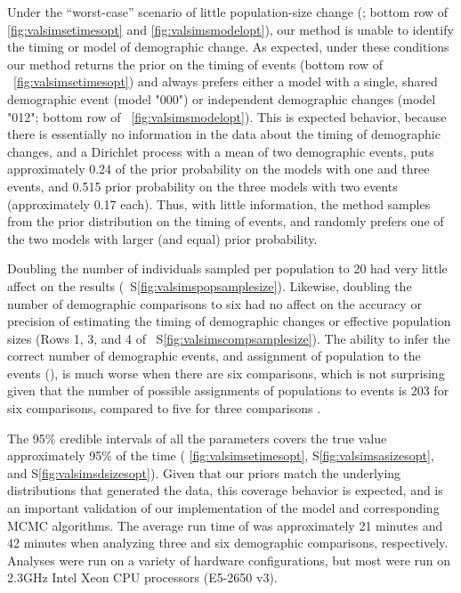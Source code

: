 \ifembed{

}{}

Under the ``worst-case'' scenario of little population-size change
(\vsimnochange; bottom row of \figs \ref{fig:valsimsetimesopt} and
\ref{fig:valsimsmodelopt}),
our method is unable to identify the timing or model of demographic change.
As expected, under these conditions our method returns the prior on the timing
of events (bottom row of \fig{}~\ref{fig:valsimsetimesopt})
and always prefers either a model with a single, shared demographic
event (model "000") or independent demographic changes (model "012";
bottom row of \fig{}~\ref{fig:valsimsmodelopt}).
This is expected behavior, because there is essentially no information in the
data about the timing of demographic changes, and a Dirichlet process with a
mean of two demographic events, puts approximately 0.24 of the prior
probability on the models with one and three events, and 0.515 prior
probability on the three models with two events (approximately 0.17 each).
Thus, with little information, the method samples from the prior distribution
on the timing of events, and randomly prefers one of the two models with larger
(and equal) prior probability.

Doubling the number of individuals sampled per population to 20 had very little
affect on the results
(\fig{}~S\ref{fig:valsimspopsamplesize}).
Likewise, doubling the number of demographic comparisons to six had no affect
on the accuracy or precision of estimating the timing of demographic changes
or effective population sizes
(Rows 1, 3, and 4 of \fig{}~S\ref{fig:valsimscompsamplesize}).
The ability to infer the correct number of demographic events,
and assignment of population to the events (\etimesets),
is much worse when there are six comparisons, which is
not surprising given that the number of possible assignments
of populations to events is 203 for six comparisons, compared
to five for three comparisons \citep{Bell1934}.

The 95\% credible intervals of all the parameters
covers the true value approximately 95\% of the time
(\figs
\ref{fig:valsimsetimesopt},
S\ref{fig:valsimsasizesopt},
and
S\ref{fig:valsimsdsizesopt}).
Given that our priors match the underlying distributions that generated the
data, this coverage behavior is expected, and is an important validation
of our implementation of the model and corresponding MCMC algorithms.
The average run time of \ecoevolity was approximately 21 minutes and 42 minutes
when analyzing three and six demographic comparisons, respectively.
Analyses were run on a variety of hardware configurations, but most were run on
2.3GHz Intel Xeon CPU processors (E5-2650 v3).


